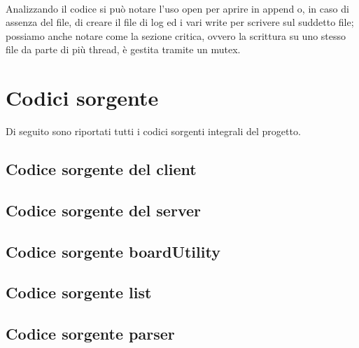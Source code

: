 \documentclass[a4paper]{article}
\begin{document}
\paragraph{}
Analizzando il codice si può notare l'uso open per aprire in append o, in caso di assenza del file, di creare
il file di log ed i vari write per scrivere sul suddetto file; possiamo anche notare come la sezione critica, ovvero 
la scrittura su uno stesso file da parte di più thread, è gestita tramite un mutex.

\appendix
\section{Codici sorgente}
Di seguito sono riportati tutti i codici sorgenti integrali del progetto.
\subsection{Codice sorgente del client}

\subsection{Codice sorgente del server}

\subsection{Codice sorgente boardUtility}


\subsection{Codice sorgente list}


\subsection{Codice sorgente parser}


\pagebreak
\lstlistoflistings
\end{document}
